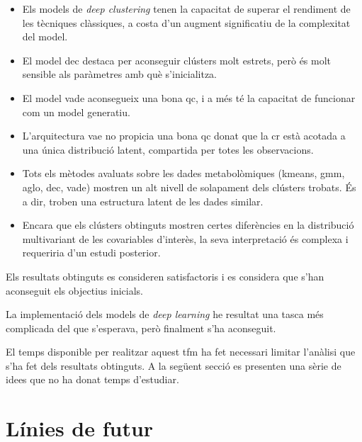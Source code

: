 \documentclass[CAT,BIB]{TFUOC}%
\begin{document}
        \begin{itemize}
            \item Els models de \textit{deep clustering}
            tenen la capacitat de superar el rendiment de les tècniques clàssiques,
            a costa d'un augment significatiu de la complexitat del model.

            \item El model \gls{dec} destaca per aconseguir clústers molt estrets,
            però és molt sensible als paràmetres amb què s'inicialitza.

            \item El model \gls{vade} aconsegueix una bona \gls{qc},
            i a més té la capacitat de funcionar com un model generatiu.

            \item L'arquitectura \gls{vae} no propicia una bona \gls{qc}
            donat que la \gls{cr} està acotada a una única distribució latent,
            compartida per totes les observacions.

            \item Tots els mètodes avaluats sobre les dades metabolòmiques
            (\gls{kmeans}, \gls{gmm}, \gls{aglo}, \gls{dec}, \gls{vade})
            mostren un alt nivell de solapament dels clústers trobats.
            És a dir, troben una estructura latent de les dades similar.

            \item Encara que els clústers obtinguts
            mostren certes diferències en la distribució multivariant
            de les covariables d'interès,
            la seva interpretació és complexa
            i requeriria d'un estudi posterior.
        \end{itemize}

        Els resultats obtinguts es consideren satisfactoris
        i es considera que s'han aconseguit els objectius inicials.

        La implementació dels models de \textit{deep learning}
        he resultat una tasca més complicada del que s'esperava,
        però finalment s'ha aconseguit.

        El temps disponible per realitzar aquest \gls{tfm}
        ha fet necessari limitar l'anàlisi que s'ha fet dels resultats obtinguts.
        A la següent secció es presenten una sèrie de idees
        que no ha donat temps d'estudiar.



    \section{Línies de futur}
    \label{s:futur}
\end{document}
